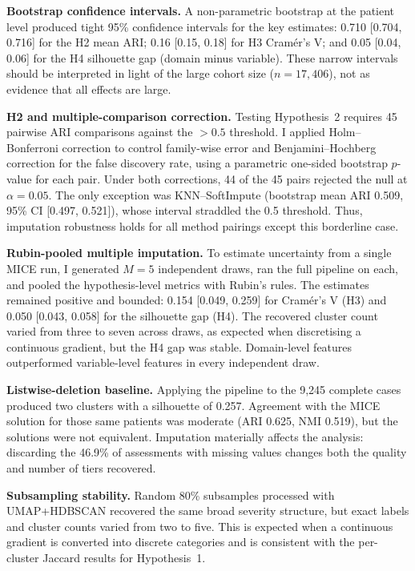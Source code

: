 \textbf{Bootstrap confidence intervals.} A non-parametric bootstrap at the patient level produced tight 95\% confidence intervals for the key estimates: 0.710 [0.704, 0.716] for the H2 mean ARI; 0.16 [0.15, 0.18] for H3 Cram\'{e}r's V; and 0.05 [0.04, 0.06] for the H4 silhouette gap (domain minus variable). These narrow intervals should be interpreted in light of the large cohort size ($n = 17{,}406$), not as evidence that all effects are large.

\textbf{H2 and multiple-comparison correction.} Testing Hypothesis~2 requires 45 pairwise ARI comparisons against the $>0.5$ threshold. I applied Holm--Bonferroni correction to control family-wise error and Benjamini--Hochberg correction for the false discovery rate, using a parametric one-sided bootstrap $p$-value for each pair. Under both corrections, 44 of the 45 pairs rejected the null at $\alpha = 0.05$. The only exception was KNN--SoftImpute (bootstrap mean ARI 0.509, 95\% CI [0.497, 0.521]), whose interval straddled the 0.5 threshold. Thus, imputation robustness holds for all method pairings except this borderline case.

\textbf{Rubin-pooled multiple imputation.} To estimate uncertainty from a single MICE run, I generated $M = 5$ independent draws, ran the full pipeline on each, and pooled the hypothesis-level metrics with Rubin's rules. The estimates remained positive and bounded: 0.154 [0.049, 0.259] for Cram\'{e}r's V (H3) and 0.050 [0.043, 0.058] for the silhouette gap (H4). The recovered cluster count varied from three to seven across draws, as expected when discretising a continuous gradient, but the H4 gap was stable. Domain-level features outperformed variable-level features in every independent draw.

\textbf{Listwise-deletion baseline.} Applying the pipeline to the 9{,}245 complete cases produced two clusters with a silhouette of 0.257. Agreement with the MICE solution for those same patients was moderate (ARI 0.625, NMI 0.519), but the solutions were not equivalent. Imputation materially affects the analysis: discarding the 46.9\% of assessments with missing values changes both the quality and number of tiers recovered.

\textbf{Subsampling stability.} Random 80\% subsamples processed with UMAP+HDBSCAN recovered the same broad severity structure, but exact labels and cluster counts varied from two to five. This is expected when a continuous gradient is converted into discrete categories and is consistent with the per-cluster Jaccard results for Hypothesis~1.

